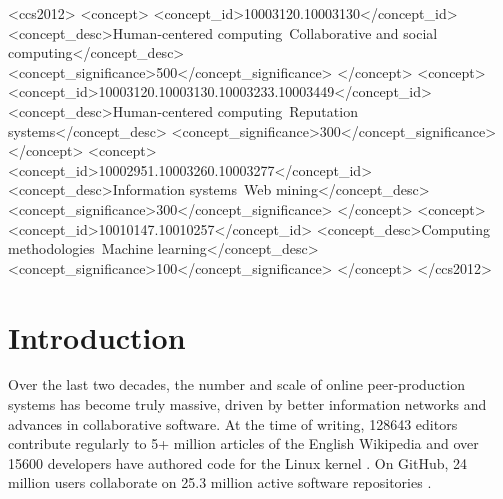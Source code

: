 \documentclass[format=sigconf]{acmart}
\begin{document}
%
%
\begin{CCSXML}
<ccs2012>
<concept>
<concept_id>10003120.10003130</concept_id>
<concept_desc>Human-centered computing~Collaborative and social computing</concept_desc>
<concept_significance>500</concept_significance>
</concept>
<concept>
<concept_id>10003120.10003130.10003233.10003449</concept_id>
<concept_desc>Human-centered computing~Reputation systems</concept_desc>
<concept_significance>300</concept_significance>
</concept>
<concept>
<concept_id>10002951.10003260.10003277</concept_id>
<concept_desc>Information systems~Web mining</concept_desc>
<concept_significance>300</concept_significance>
</concept>
<concept>
<concept_id>10010147.10010257</concept_id>
<concept_desc>Computing methodologies~Machine learning</concept_desc>
<concept_significance>100</concept_significance>
</concept>
</ccs2012>
\end{CCSXML}





\maketitle

\section{Introduction}
\label{sec:intro}

Over the last two decades, the number and scale of online peer-production systems has become truly massive, driven by better information networks and advances in collaborative software.
At the time of writing, \num{128643} editors contribute regularly to \num{5}+ million articles of the English Wikipedia \citep{wikipedia2017wikipedians} and over \num{15600} developers have authored code for the Linux kernel \citep{corbet2017linux}.
On GitHub, \num{24} million users collaborate on \num{25.3} million active software repositories \citep{github2017octoverse}.
\end{document}
